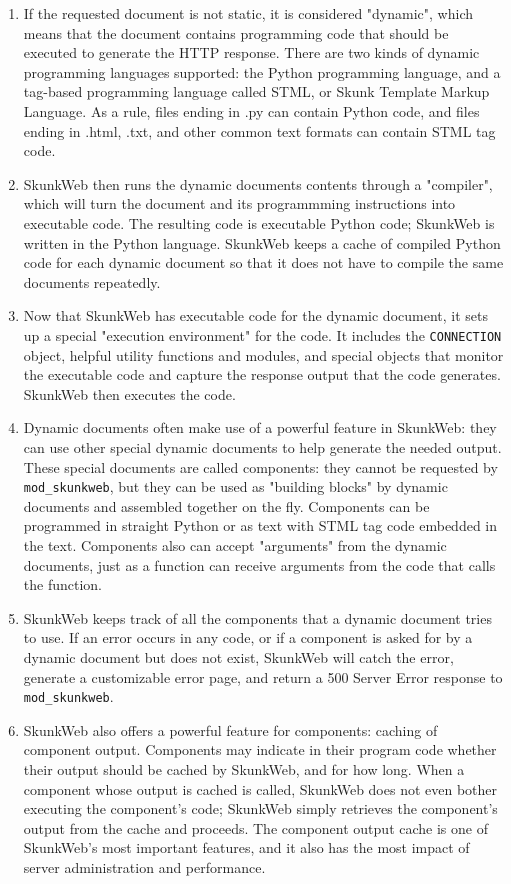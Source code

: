 \documentclass[titlepage]{manual}
\begin{document}
\begin{enumerate}
\item If the requested document is not static, it is considered
"dynamic", which means that the document contains programming code
that should be executed to generate the HTTP response. There are two
kinds of dynamic programming languages supported: the Python
programming language, and a tag-based programming language called
STML, or Skunk Template Markup Language. As a rule, files ending in
.py can contain Python code, and files ending in .html, .txt, and
other common text formats can contain STML tag code.

\item SkunkWeb then runs the dynamic documents contents through a
"compiler", which will turn the document and its programmming
instructions into executable code. The resulting code is executable
Python code; SkunkWeb is written in the Python language. SkunkWeb
keeps a cache of compiled Python code for each dynamic document so
that it does not have to compile the same documents repeatedly.

\item Now that SkunkWeb has executable code for the dynamic document,
it sets up a special "execution environment" for the code. It includes
the \texttt{CONNECTION} object, helpful utility functions and modules, and
special objects that monitor the executable code and capture the
response output that the code generates. SkunkWeb then executes the
code.

\item Dynamic documents often make use of a powerful feature in
SkunkWeb: they can use other special dynamic documents to help
generate the needed output. These special documents are called
components: they cannot be requested by \texttt{mod\_skunkweb}, but
they can be used as "building blocks" by dynamic documents and
assembled together on the fly. Components can be programmed in
straight Python or as text with STML tag code embedded in the
text. Components also can accept "arguments" from the dynamic
documents, just as a function can receive arguments from the code that
calls the function.

\item SkunkWeb keeps track of all the components that a dynamic
document tries to use. If an error occurs in any code, or if a
component is asked for by a dynamic document but does not exist,
SkunkWeb will catch the error, generate a customizable error page,
and return a 500 Server Error response to \texttt{mod\_skunkweb}.

\item SkunkWeb also offers a powerful feature for components: caching
of component output. Components may indicate in their program code
whether their output should be cached by SkunkWeb, and for how long.
When a component whose output is cached is called, SkunkWeb does not
even bother executing the component's code; SkunkWeb simply retrieves
the component's output from the cache and proceeds. The component
output cache is one of SkunkWeb's most important features, and it also
has the most impact of server administration and performance.


\end{enumerate}
\end{document}
